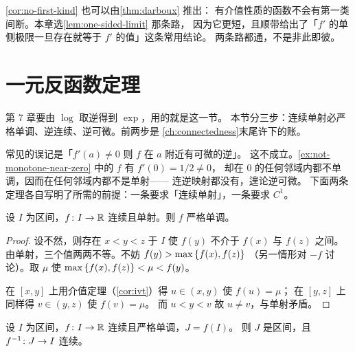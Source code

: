 \begin{remark}
  \cref{cor:no-first-kind} 也可以由\cref{thm:darboux} 推出：
  有介值性质的函数不会有第一类间断。本章选\cref{lem:one-sided-limit} 那条路，
  因为它更短，且顺带给出了「\(f'\) 的单侧极限一旦存在就等于 \(f'\) 的值」这条常用结论。
  两条路都通，不是非此即彼。
\end{remark}

\section{一元反函数定理}
\label{sec:inverse-function}

第 7 章要由 \(\log\) 取逆得到 \(\exp\)，用的就是这一节。
本节分三步：连续单射必严格单调、逆连续、逆可微。前两步是%
\cref{ch:connectedness}末尾许下的账。

\begin{pitfall}
  常见的误记是「\(f'(a) \neq 0\) 则 \(f\) 在 \(a\) 附近有可微的逆」。
  这不成立。\cref{ex:not-monotone-near-zero} 中的 \(f\) 有 \(f'(0)=1/2 \neq 0\)，
  却在 \(0\) 的任何邻域内都不单调，因而在任何邻域内都不是单射——
  连逆映射都没有，遑论逆可微。
  下面两条定理各自写明了所需的前提：一条要求「连续单射」，一条要求 \(C^{1}\)。
\end{pitfall}

\begin{proposition}[连续单射必严格单调]
  \label{prop:injective-monotone}
  设 \(I\) 为区间，\(f \colon I \to \mathbb{R}\) 连续且单射。则 \(f\) 严格单调。
\end{proposition}

\begin{proof}
  设不然，则存在 \(x<y<z\) 于 \(I\) 使 \(f(y)\) 不介于 \(f(x)\) 与 \(f(z)\) 之间。
  由单射，三个值两两不等。不妨 \(f(y) > \max\left\{f(x),f(z)\right\}\)
  （另一情形对 \(-f\) 讨论）。取 \(\mu\) 使 \(\max\left\{f(x),f(z)\right\} < \mu < f(y)\)。

  在 \([x,y]\) 上用介值定理（\cref{cor:ivt}）得 \(u \in (x,y)\) 使 \(f(u)=\mu\)；
  在 \([y,z]\) 上同样得 \(v \in (y,z)\) 使 \(f(v)=\mu\)。
  而 \(u<y<v\) 故 \(u \neq v\)，与单射矛盾。
\end{proof}

\begin{proposition}[逆连续]
  \label{prop:inverse-continuous}
  设 \(I\) 为区间，\(f \colon I \to \mathbb{R}\) 连续且严格单调，\(J = f(I)\)。
  则 \(J\) 是区间，且 \(f^{-1} \colon J \to I\) 连续。
\end{proposition}

